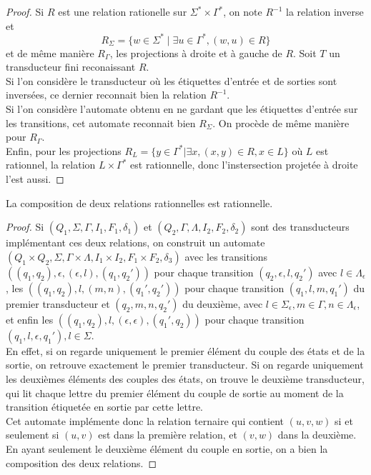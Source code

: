 \documentclass{scrartcl}
\begin{document}
\begin{flushleft}
\begin{proof}
    Si $R$ est une relation rationelle sur $\Sigma^* \times \Gamma^*$, on note $R^{-1}$ la relation inverse et
    \[ R_{\Sigma} = \{ w \in \Sigma^* \mid \exists u \in \Gamma^*, (w, u) \in R \} \]
    et de même manière $R_{\Gamma}$, les projections à droite et à gauche de $R$. Soit $T$ un transducteur fini reconaissant $R$.\\
    Si l'on considère le transducteur où les étiquettes d'entrée et de sorties sont inversées, ce dernier reconnait bien la
    relation $R^{-1}$.\\
    Si l'on considère l'automate obtenu en ne gardant que les étiquettes d'entrée sur les transitions, cet automate reconnait bien $R_{\Sigma}$.
    On procède de même manière pour $R_{\Gamma}$.\\
    Enfin, pour les projections $R_L  = \{ y \in \Gamma^* | \exists x, (x, y) \in R, x \in L \}$ où $L$ est rationnel, la relation $L \times \Gamma^*$ est rationnelle, donc l'instersection projetée à droite l'est aussi.
\end{proof}

\begin{prop}
    La composition de deux relations rationnelles est rationnelle.
\end{prop}

\begin{proof}
    Si $(Q_1, \Sigma, \Gamma, I_1, F_1, \delta_1)$ et $(Q_2, \Gamma, \Lambda, I_2, F_2, \delta_2)$ sont des transducteurs implémentant ces deux relations,
    on construit un automate  $(Q_1 \times Q_2, \Sigma, \Gamma \times \Lambda, I_1 \times I_2, F_1 \times F_2, \delta_3)$ avec les transitions
    $((q_1, q_2), \epsilon, (\epsilon, l), (q_1, q_2'))$ pour chaque transition $(q_2, \epsilon , l, q_2')$ avec $l \in \Lambda_\epsilon$, les $((q_1, q_2), l, (m, n), (q_1', q_2'))$ pour chaque transition $(q_1, l, m, q_1')$ du premier transducteur et $(q_2, m, n, q_2')$ du deuxième, avec $l \in \Sigma_\epsilon, m \in \Gamma, n \in \Lambda_\epsilon$, et enfin les $((q_1, q_2), l, (\epsilon, \epsilon), (q_1', q_2))$ pour chaque transition $(q_1, l, \epsilon, q_1'), l \in \Sigma$.\\
    En effet, si on regarde uniquement le premier élément du couple des états et de la sortie, on retrouve exactement le premier transducteur.
    Si on regarde uniquement les deuxièmes éléments des couples des états, on trouve le deuxième transducteur, qui lit chaque lettre du premier élément
    du couple de sortie au moment de la transition étiquetée en sortie par cette lettre.\\
    Cet automate implémente donc la relation ternaire qui contient $(u, v, w)$ si et seulement si $(u, v)$ est dans la première relation, et $(v, w)$ dans la deuxième. En ayant seulement le deuxième élément du couple en sortie, on a bien la composition des deux relations.
\end{proof}


\end{flushleft}
\end{document}
